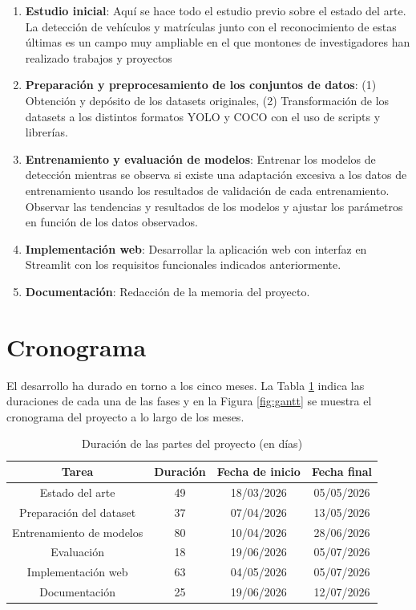 \documentclass[12pt,a4paper,onecolumn,oneside]{report}
\begin{document}
\begin{enumerate}
    \item \textbf{Estudio inicial}: Aquí se hace todo el estudio previo sobre el estado del arte. La detección de vehículos y matrículas junto con el reconocimiento de estas últimas es un campo muy ampliable en el que montones de investigadores han realizado trabajos y proyectos 

    \item \textbf{Preparación y preprocesamiento de los conjuntos de datos}: (1) Obtención y depósito de los datasets originales, (2)
    Transformación de los datasets a los distintos formatos YOLO y COCO con el uso de scripts y librerías.

    \item \textbf{Entrenamiento y evaluación de modelos}: Entrenar los modelos de detección mientras se observa si existe una adaptación excesiva a los datos de entrenamiento usando los resultados de validación de cada entrenamiento. Observar las tendencias y resultados de los modelos y ajustar los parámetros en función de los datos observados.

    \item \textbf{Implementación web}: Desarrollar la aplicación web con interfaz en Streamlit con los requisitos funcionales indicados anteriormente.

    \item \textbf{Documentación}: Redacción de la memoria del proyecto.
\end{enumerate}

\section{Cronograma}

El desarrollo ha durado en torno a los cinco meses. La Tabla \ref{Actividades} indica las duraciones de cada una de las fases y en la Figura \ref{fig:gantt} se muestra el cronograma del proyecto a lo largo de los meses.

\begin{table}[ht]
    \centering
    \caption{Duración de las partes del proyecto (en días)}
    \begin{tabular}{|c|c|c|c|}
        \hline
        \textbf{Tarea} & \textbf{Duración} & \textbf{Fecha de inicio} & \textbf{Fecha final}\\
        \hline
        Estado del arte & 49 & 18/03/2026 & 05/05/2026\\
        \hline
        Preparación del dataset & 37 & 07/04/2026 & 13/05/2026\\
        \hline
        Entrenamiento de modelos & 80 & 10/04/2026 & 28/06/2026\\
        \hline
        Evaluación & 18 & 19/06/2026 & 05/07/2026\\
        \hline
        Implementación web & 63 & 04/05/2026 & 05/07/2026\\
        \hline
        Documentación & 25 & 19/06/2026 & 12/07/2026\\
        \hline
    \end{tabular}
    \label{Actividades}
\end{table}
\end{document}
